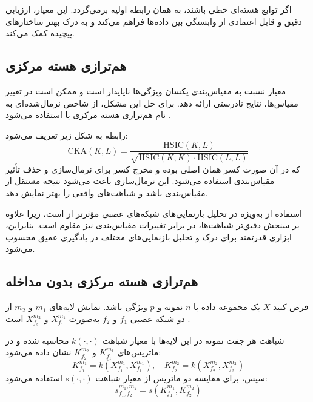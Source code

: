  اگر توابع هسته‌ای خطی باشند،  
 به همان رابطه اولیه برمی‌گردد. این معیار، ارزیابی دقیق و قابل اعتمادی از وابستگی بین داده‌ها فراهم می‌کند و به درک بهتر ساختارهای پیچیده کمک می‌کند.
 
 
 
 
 
 \subsection{
 	هم‌ترازی هسته مرکزی%
 }
 معیار  
 نسبت به مقیاس‌بندی یکسان ویژگی‌ها ناپایدار است و ممکن است در تغییر مقیاس‌ها، نتایج نادرستی ارائه دهد. برای حل این مشکل، از شاخص نرمال‌شده‌ای به نام هم‌ترازی هسته مرکزی یا  
 استفاده می‌شود  
 \cite{cortes2012algorithms, cristianini2001kernel}.  
 
 رابطه  
 به شکل زیر تعریف می‌شود:  
 \[
 \text{CKA}(K, L) = \frac{\text{HSIC}(K, L)}{\sqrt{\text{HSIC}(K, K) \cdot \text{HSIC}(L, L)}}  
 \]  
 که در آن صورت کسر همان  
 اصلی بوده و مخرج کسر برای نرمال‌سازی و حذف تأثیر مقیاس‌بندی استفاده می‌شود. این نرمال‌سازی باعث می‌شود نتیجه مستقل از مقیاس‌بندی باشد و شباهت‌های واقعی را بهتر نمایش دهد.  
 
 استفاده از  
 به‌ویژه در تحلیل بازنمایی‌های شبکه‌های عصبی مؤثرتر از  
 است، زیرا علاوه بر سنجش دقیق‌تر شباهت‌ها، در برابر تغییرات مقیاس‌بندی نیز مقاوم است. بنابراین،  
 ابزاری قدرتمند برای درک و تحلیل بازنمایی‌های مختلف در یادگیری عمیق محسوب می‌شود.
 
 
 
 \subsection{
 	هم‌ترازی هسته مرکزی بدون مداخله%
 }\label{sec_dCKA}
 فرض کنید \(X\) یک مجموعه داده با \(n\) نمونه و \(p\) ویژگی باشد. نمایش لایه‌های \(m_1\) و \(m_2\) از دو شبکه عصبی \(f_1\) و \(f_2\) به‌صورت  
 \(X^{m_1}_{f_1}\)  
 و  
 \(X^{m_2}_{f_2}\)  
 است  
 \cite{cui2022deconfounded}.  
 
 شباهت هر جفت نمونه در این لایه‌ها با معیار شباهت \( k(\cdot, \cdot) \) محاسبه شده و در ماتریس‌های  
 \(K^{m_1}_{f_1}\)  
 و  
 \(K^{m_2}_{f_2}\)  
 نشان داده می‌شود:  
 \[
 K^{m_1}_{f_1} = k(X^{m_1}_{f_1}, X^{m_1}_{f_1}), \quad K^{m_2}_{f_2} = k(X^{m_2}_{f_2}, X^{m_2}_{f_2})  
 \]  
 سپس، برای مقایسه دو ماتریس از معیار شباهت \( s(\cdot, \cdot) \) استفاده می‌شود:  
 \[
 s^{m_1,m_2}_{f_1,f_2} = s(K^{m_1}_{f_1}, K^{m_2}_{f_2})  
 \]  
 
